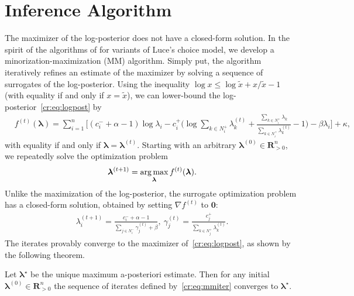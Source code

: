 \section{Inference Algorithm}  %
\label{cr:sec:algorithm}

The maximizer of the log-posterior does not have a closed-form solution.
In the spirit of the algorithms of \citet{hunter2004mm} for variants of Luce's choice model, we develop a minorization-maximization (MM) algorithm.
Simply put, the algorithm iteratively refines an estimate of the maximizer by solving a sequence of surrogates of the log-posterior.
Using the inequality $\log x \le \log \tilde{x} + x/\tilde{x} - 1$ (with equality if and only if $x = \tilde{x}$), we can lower-bound the log-posterior~\eqref{cr:eq:logpost} by
\begin{align*}
&f^{(t)}(\bm{\lambda}) =
    \sum_{i = 1}^n \bigg[ (c^-_i + \alpha - 1) \log \lambda_i 
                         - c^+_i \bigg( \log\!\sum_{k \in N^+_i}\!\lambda^{(t)}_k
                                       +\frac{\sum_{k \in N^+_i}\!\lambda_k}{\sum_{k \in N^+_i}\!\lambda^{(t)}_k} -1 \bigg)
                         - \beta \lambda_i \bigg] + \kappa,
\end{align*}
with equality if and only if $\bm{\lambda} = \bm{\lambda}^{(t)}$.
Starting with an arbitrary $\bm{\lambda}^{(0)} \in \mathbf{R}^n_{>0}$, we repeatedly solve the optimization problem
\begin{align*}
\bm{\lambda}^{(t+1)} = \operatorname*{arg\,max}_{\bm{\lambda}} f^{(t)}(\bm{\lambda}).
\end{align*}
Unlike the maximization of the log-posterior, the surrogate optimization problem has a closed-form solution, obtained by setting $\nabla f^{(t)}$ to $\bm{0}$:
\begin{align}
\label{cr:eq:mmiter}
\lambda_i^{(t + 1)} = \frac{c^-_i + \alpha - 1}{\sum_{j \in N^-_i} \gamma_j^{(t)} + \beta},
\ \gamma_j^{(t)} = \frac{c^+_j}{\sum_{k \in N^+_j} \lambda_k^{(t)}}.
\end{align}
The iterates provably converge to the maximizer of~\eqref{cr:eq:logpost}, as shown by the following theorem.

\begin{theorem}
\label{cr:thm:mmconv}
Let $\bm{\lambda}^\star$ be the unique maximum a-posteriori estimate.
Then for any initial $\bm{\lambda}^{(0)} \in \mathbf{R}^n_{> 0}$ the sequence of iterates defined by~\eqref{cr:eq:mmiter} converges to $\bm{\lambda}^\star$.
\end{theorem}

